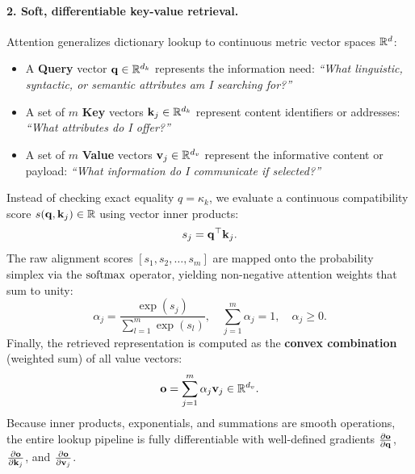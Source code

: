 \documentclass[../../main.tex]{subfiles}
\begin{document}
\paragraph{2. Soft, differentiable key-value retrieval.}
Attention generalizes dictionary lookup to continuous metric vector spaces $\mathbb{R}^d$:
\begin{itemize}
    \item A \textbf{Query} vector $\mathbf{q} \in \mathbb{R}^{d_k}$ represents the information need: \emph{``What linguistic, syntactic, or semantic attributes am I searching for?''}
    \item A set of $m$ \textbf{Key} vectors $\mathbf{k}_j \in \mathbb{R}^{d_k}$ represent content identifiers or addresses: \emph{``What attributes do I offer?''}
    \item A set of $m$ \textbf{Value} vectors $\mathbf{v}_j \in \mathbb{R}^{d_v}$ represent the informative content or payload: \emph{``What information do I communicate if selected?''}
\end{itemize}

Instead of checking exact equality $q = \kappa_k$, we evaluate a continuous compatibility score $s(\mathbf{q}, \mathbf{k}_j) \in \mathbb{R}$ using vector inner products:
\begin{equation}
\label{eq:raw_compatibility_score}
s_j = \mathbf{q}^\top \mathbf{k}_j.
\end{equation}
The raw alignment scores $[s_1, s_2, \dots, s_m]$ are mapped onto the probability simplex via the $\operatorname{\mathrm{softmax}}$ operator, yielding non-negative attention weights that sum to unity:
\begin{equation}
\label{eq:softmax_attention_weight}
\alpha_j = \frac{\exp(s_j)}{\sum_{l=1}^m \exp(s_l)}, \quad \sum_{j=1}^m \alpha_j = 1, \quad \alpha_j \ge 0.
\end{equation}
Finally, the retrieved representation is computed as the \textbf{convex combination} (weighted sum) of all value vectors:
\begin{equation}
\label{eq:attention_convex_combination}
\mathbf{o} = \sum_{j=1}^m \alpha_j \mathbf{v}_j \in \mathbb{R}^{d_v}.
\end{equation}
Because inner products, exponentials, and summations are smooth operations, the entire lookup pipeline is fully differentiable with well-defined gradients $\frac{\partial \mathbf{o}}{\partial \mathbf{q}}$, $\frac{\partial \mathbf{o}}{\partial \mathbf{k}_j}$, and $\frac{\partial \mathbf{o}}{\partial \mathbf{v}_j}$.
\end{document}
